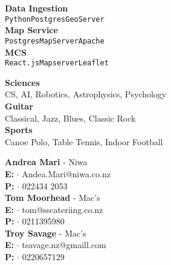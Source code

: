 \documentclass[9pt]{developercv} %
\begin{document}
\begin{minipage}[t]{0.3\textwidth}
	\vspace{-\baselineskip} %

	{
		\textbf{Data Ingestion} \\
		\texttt{Python}\slashsep\texttt{Postgres}\slashsep\texttt{GeoServer}\\
	}
	{
		\textbf{Map Service} \\
		\texttt{Postgres}\slashsep\texttt{MapServer}\slashsep\texttt{Apache}\\
	}
	{
		\textbf{MCS} \\
		\texttt{React.js}\slashsep\texttt{Mapserver}\slashsep\texttt{Leaflet}\\
	}
\end{minipage}
\hfill
\begin{minipage}[t]{0.3\textwidth}
	\vspace{-\baselineskip} %


	{
		\textbf{Sciences} \\
		CS, AI, Robotics, Astrophysics, Psychology \\
	}
	{
		\textbf{Guitar} \\
		 Classical, Jazz, Blues, Classic Rock \\
	}
	{
		\textbf{Sports} \\
		Canoe Polo, Table Tennis, Indoor Football \\
	}
\end{minipage}
\hfill
\begin{minipage}[t]{0.3\textwidth}
	\vspace{-\baselineskip} %

	{
		\textbf{Andrea Mari} - Niwa \\
		\textbf{E:} $\cdot$ Andea.Mari@niwa.co.nz \\
		\textbf{P:} $\cdot$ 022434 2053 \\
	}
	{
		\textbf{Tom Moorhead} - Mac's\\
		\textbf{E:} $\cdot$ tom@sscateriing.co.nz \\
		\textbf{P:} $\cdot$  0211395980 \\
	}
	{
		\textbf{Troy Savage} - Mac's \\
		\textbf{E:} $\cdot$ tsavage.nz@gmaill.com \\
		\textbf{P:} $\cdot$ 0220657129
	}
\end{minipage}

\end{document}
